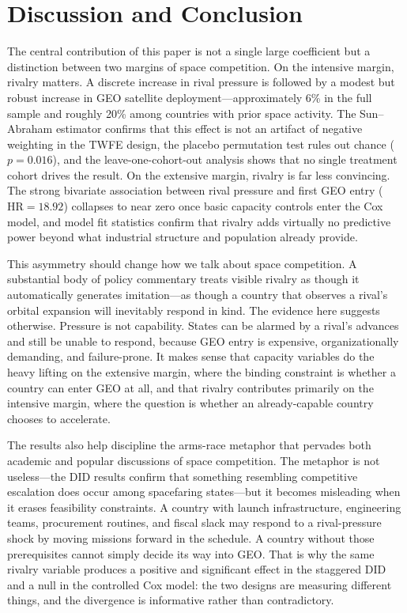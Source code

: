 \documentclass[11pt]{article}
\begin{document}
\section{Discussion and Conclusion}
\label{sec:conclusion}

The central contribution of this paper is not a single large coefficient but a distinction between two margins of space competition. On the intensive margin, rivalry matters. A discrete increase in rival pressure is followed by a modest but robust increase in GEO satellite deployment---approximately 6\% in the full sample and roughly 20\% among countries with prior space activity. The Sun--Abraham estimator confirms that this effect is not an artifact of negative weighting in the TWFE design, the placebo permutation test rules out chance ($p = 0.016$), and the leave-one-cohort-out analysis shows that no single treatment cohort drives the result. On the extensive margin, rivalry is far less convincing. The strong bivariate association between rival pressure and first GEO entry ($\text{HR} = 18.92$) collapses to near zero once basic capacity controls enter the Cox model, and model fit statistics confirm that rivalry adds virtually no predictive power beyond what industrial structure and population already provide.

This asymmetry should change how we talk about space competition. A substantial body of policy commentary treats visible rivalry as though it automatically generates imitation---as though a country that observes a rival's orbital expansion will inevitably respond in kind. The evidence here suggests otherwise. Pressure is not capability. States can be alarmed by a rival's advances and still be unable to respond, because GEO entry is expensive, organizationally demanding, and failure-prone. It makes sense that capacity variables do the heavy lifting on the extensive margin, where the binding constraint is whether a country can enter GEO at all, and that rivalry contributes primarily on the intensive margin, where the question is whether an already-capable country chooses to accelerate.

The results also help discipline the arms-race metaphor that pervades both academic and popular discussions of space competition. The metaphor is not useless---the DID results confirm that something resembling competitive escalation does occur among spacefaring states---but it becomes misleading when it erases feasibility constraints. A country with launch infrastructure, engineering teams, procurement routines, and fiscal slack may respond to a rival-pressure shock by moving missions forward in the schedule. A country without those prerequisites cannot simply decide its way into GEO. That is why the same rivalry variable produces a positive and significant effect in the staggered DID and a null in the controlled Cox model: the two designs are measuring different things, and the divergence is informative rather than contradictory.
\end{document}
